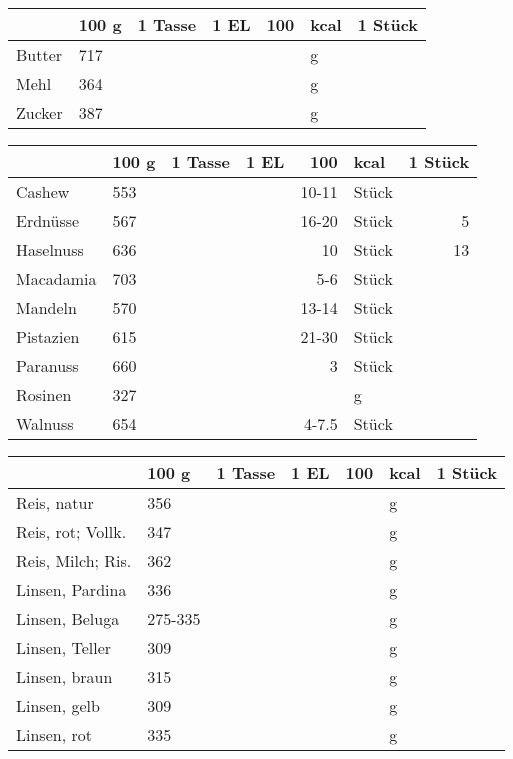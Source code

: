 \begin{tabularx}{\linewidth}{X|l|r|r|rl|r}
                  &   100 g & 1 Tasse & 1 EL &      100 & kcal    & 1 Stück  \\
\hline
Butter            &     717 &         &      &          & g       &          \\
Mehl              &     364 &         &      &          & g       &          \\
Zucker            &     387 &         &      &          & g       &          \\
\end{tabularx}
\begin{tabularx}{\linewidth}{X|l|r|r|rl|r}
                  &   100 g & 1 Tasse & 1 EL &      100 & kcal    & 1 Stück  \\
\hline
Cashew            &     553 &         &      &  10-11   & Stück   &          \\
Erdnüsse          &     567 &         &      &  16-20   & Stück   &       5  \\
Haselnuss         &     636 &         &      &     10   & Stück   &      13  \\
Macadamia         &     703 &         &      &    5-6   & Stück   &          \\
Mandeln           &     570 &         &      &  13-14   & Stück   &          \\
Pistazien         &     615 &         &      &  21-30   & Stück   &          \\
Paranuss          &     660 &         &      &      3   & Stück   &          \\
Rosinen           &     327 &         &      &          & g       &          \\
Walnuss           &     654 &         &      &    4-7.5 & Stück   &          \\
\end{tabularx}
\begin{tabularx}{\linewidth}{X|l|r|r|rl|r}
                  &   100 g & 1 Tasse & 1 EL &      100 & kcal    & 1 Stück  \\
\hline
Reis, natur       &     356 &         &      &          & g       &          \\
Reis, rot; Vollk. &     347 &         &      &          & g       &          \\
Reis, Milch; Ris. &     362 &         &      &          & g       &          \\
Linsen, Pardina   &     336 &         &      &          & g       &          \\
Linsen, Beluga    & 275-335 &         &      &          & g       &          \\
Linsen, Teller    &     309 &         &      &          & g       &          \\
Linsen, braun     &     315 &         &      &          & g       &          \\
Linsen, gelb      &     309 &         &      &          & g       &          \\
Linsen, rot       &     335 &         &      &          & g       &          \\
\end{tabularx}
